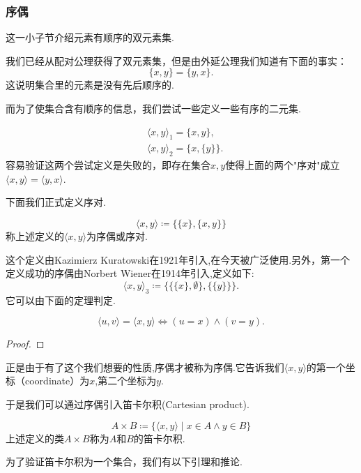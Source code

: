 \subsubsection{序偶}

这一小子节介绍元素有顺序的双元素集.

我们已经从配对公理获得了双元素集，但是由外延公理我们知道有下面的事实：
\[\{x,y\}=\{y,x\}.\]
这说明集合里的元素是没有先后顺序的.

而为了使集合含有顺序的信息，我们尝试一些定义一些有序的二元集.

\begin{example}
\begin{align*}
    &\langle x,y\rangle_1=\{x,y\},\\
    &\langle x,y\rangle_2=\{x,\{y\}\}.
\end{align*}
容易验证这两个尝试定义是失败的，即存在集合$x,y$使得上面的两个"序对"成立$\langle x,y\rangle=\langle y,x\rangle$.    
\end{example}

下面我们正式定义序对.
\begin{definition}
    [序偶]
    \[
    \langle x,y\rangle\coloneq\{\{x\},\{x,y\}\}\]
    称上述定义的$\langle x,y\rangle$为序偶或序对.
\end{definition}
\begin{note}
    这个定义由Kazimierz Kuratowski在1921年引入,在今天被广泛使用.另外，第一个定义成功的序偶由Norbert Wiener在1914年引入,定义如下:
    \[\langle x,y\rangle_3\coloneq\{\{\{x\},\emptyset\},\{\{y\}\}\}.\]
    它可以由下面的定理判定.
\end{note}

\begin{theorem}
    [序偶的判定]
    \[\langle u,v\rangle=\langle x,y\rangle\iff (u=x)\wedge (v=y).\]
\end{theorem}

\begin{proof}%
\end{proof}
正是由于有了这个我们想要的性质,序偶才被称为序偶.它告诉我们$\langle x,y\rangle$的第一个坐标（coordinate）为$x$,第二个坐标为$y$.

于是我们可以通过序偶引入笛卡尔积(Cartesian product).
\begin{definition}
    [笛卡尔积]
    \[A\times B\coloneq\{\langle x,y\rangle\mid x\in A \wedge y\in B\}\]
    上述定义的类$A\times B$称为$A$和$B$的笛卡尔积.
\end{definition}

为了验证笛卡尔积为一个集合，我们有以下引理和推论.

